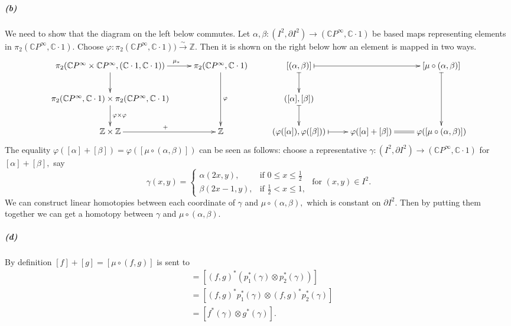 \documentclass{article}
\begin{document}
\subparagraph{(b)}
We need to show that the diagram on the left below commutes. Let $\alpha,\beta\colon (I^2,\partial I^2)\rightarrow(\mathbb{C}P^{\infty},\mathbb{C}\cdot1)$ be based maps representing elements in $\pi_2(\mathbb{C}P^{\infty},\mathbb{C}\cdot1).$ Choose $\varphi\colon\pi_2(\mathbb{C}P^{\infty},\mathbb{C}\cdot1))\xrightarrow{\sim}\mathbb{Z}.$ Then it is shown on the right below how an element is mapped in two ways.
\[\xymatrix{
\pi_2(\mathbb{C}P^{\infty}\times\mathbb{C}P^{\infty},(\mathbb{C}\cdot1,\mathbb{C}\cdot1))\ar[d]\ar[r]^(.6){\mu_*} & \pi_2(\mathbb{C}P^{\infty},\mathbb{C}\cdot1)\ar[dd]^{\varphi} & [(\alpha,\beta)]\ar@{|->}[rr]\ar@{|->}[d] & &[\mu\circ(\alpha,\beta)]\ar@{|->}[dd]\\
\pi_2(\mathbb{C}P^{\infty},\mathbb{C}\cdot1)\times\pi_2(\mathbb{C}P^{\infty},\mathbb{C}\cdot1)\ar[d]^{\varphi\times\varphi} & &([\alpha],[\beta])\ar@{|->}[d] & &\\
\mathbb{Z}\times\mathbb{Z}\ar[r]^{+} &\mathbb{Z} &(\varphi([\alpha]),\varphi([\beta]))\ar@{|->}[r] &\varphi([\alpha]+[\beta])\ar@{=}[r] & \varphi([\mu\circ(\alpha,\beta)])
}\]
The equality $\varphi([\alpha]+[\beta])=\varphi([\mu\circ(\alpha,\beta)])$ can be seen as follows: choose a representative $\gamma\colon (I^2,\partial I^2)\rightarrow(\mathbb{C}P^{\infty},\mathbb{C}\cdot1)$ for $[\alpha]+[\beta],$ say
\[\gamma(x,y)=\begin{cases}
                \alpha(2x,y), & \mbox{if } 0\leq x\leq\frac{1}{2} \\
                \beta(2x-1,y), & \mbox{if } \frac{1}{2}<x\leq 1,
              \end{cases}
              \text{ for }(x,y)\in I^2.\]
We can construct linear homotopies between each coordinate of $\gamma$ and $\mu\circ(\alpha,\beta),$ which is constant on $\partial I^2.$ Then by putting them together we can get a homotopy between $\gamma$ and $\mu\circ(\alpha,\beta).$

\subparagraph{(d)}By definition $[f]+[g]=[\mu\circ(f,g)]$ is sent to
\begin{align*}
[(f,g)^*\mu^*(\gamma)] &=[(f,g)^*(p_1^*(\gamma)\otimes p_2^*(\gamma))]\\
&=[(f,g)^*p_1^*(\gamma)\otimes (f,g)^*p_2^*(\gamma)]\\
&=[f^*(\gamma)\otimes g^*(\gamma)].
\end{align*}
\end{document}
